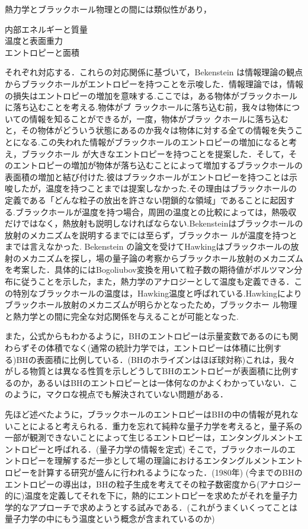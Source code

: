 熱力学とブラックホール物理との間には類似性があり，
\begin{center}
内部エネルギーと質量 \\
温度と表面重力\\
エントロピーと面積
\end{center}
それぞれ対応する．これらの対応関係に基づいて，Bekenstein は情報理論の観点 からブラックホールがエントロピーを持つことを示唆した．情報理論では，情報の損失はエントロピーの増加を意味する.ここでは，ある物体がブラックホールに落ち込むことを考える.物体がブ ラックホールに落ち込む前，我々は物体についての情報を知ることができるが，一度，物体がブラッ クホールに落ち込むと，その物体がどういう状態にあるのか我々は物体に対する全ての情報を失うこ とになる.この失われた情報がブラックホールのエントロピーの増加になると考え，ブラックホール が大きなエントロピーを持つことを提案した．そして，そのエントロピーの増加が物体が落ち込むことによって増加するブラックホールの表面積の増加と結び付けた.彼はブラックホールがエントロピーを持つことは示唆したが，温度を持つことまでは提案しなかった.その理由はブラックホールの定義である「どんな粒子の放出を許さない閉鎖的な領域」であることに起因する.ブラックホールが温度を持つ場合，周囲の温度との比較によっては，熱吸収だけではなく，熱放射も説明しなければならない.Bekensteinはブラックホールの放射のメカニズムを説明するまでには至らず，ブラックホー ルが温度を持つとまでは言えなかった.
Bekenstein の論文を受けてHawkingはブラックホールの放射のメカニズムを探し，場の量子論の考察からブラックホール放射のメカニズムを考案した．具体的にはBogoliubov変換を用いて粒子数の期待値がボルツマン分布に従うことを示した，また，熱力学のアナロジーとして温度も定義できる．この特別なブラックホールの温度は，Hawking温度と呼ばれている.Hawkingによりブラックホール放射のメカニズムが明らかとなったため，ブラックホー ル物理と熱力学との間に完全な対応関係を与えることが可能となった.


また，公式からもわかるように，BHのエントロピーは示量変数であるのにも関わらずその体積でなく(通常の統計力学では，エントロピーは体積に比例する)BHの表面積に比例している．(BHのホライズンはほぼ球対称)これは，我々がしる物質とは異なる性質を示しどうしてBHのエントロピーが表面積に比例するのか，あるいはBHのエントロピーとは一体何なのかよくわかっていない．このように，マクロな視点でも解決されていない問題がある．


先ほど述べたように，ブラックホールのエントロピーはBHの中の情報が見れないことによると考えられる．重力を忘れて純粋な量子力学を考えると，量子系の一部が観測できないことによって生じるエントロピーは，エンタングルメントエントロピーと呼ばれる．(量子力学の情報を定式)
そこで，ブラックホールのエントロピーを理解するだ一歩として場の理論におけるエンタングルメントエントロピーを計算する研究が盛んに行われるようになった．(1980年)
(今までのBHのエントロピーの導出は，BHの粒子生成を考えてその粒子数密度から(アナロジー的に)温度を定義してそれを下に，熱的にエントロピーを求めたがそれを量子力学的なアプローチで求めようとする試みである．(これがうまくいくってことは量子力学の中にもう温度という概念が含まれているのか)
